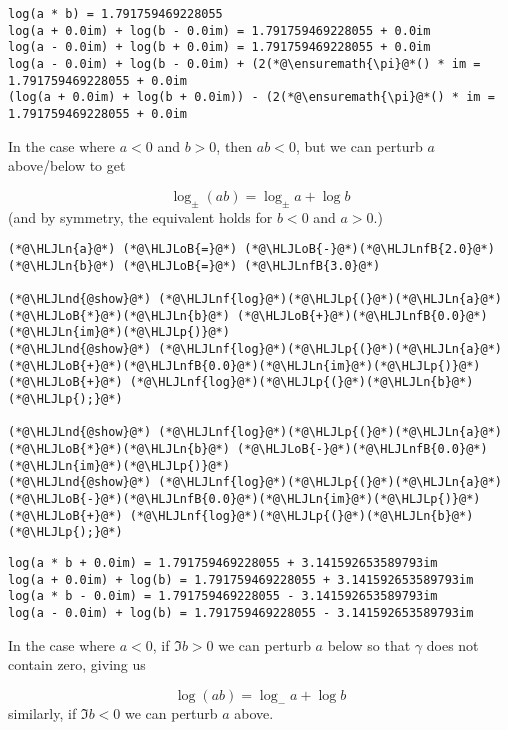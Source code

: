 \documentclass[12pt,landscape]{article}
\newcommand{\HLJLn}[1]{#1}
\newcommand{\HLJLnd}[1]{\textcolor[RGB]{214,102,97}{#1}}
\newcommand{\HLJLnf}[1]{\textcolor[RGB]{66,102,213}{#1}}
\newcommand{\HLJLnfB}[1]{\textcolor[RGB]{59,151,46}{#1}}
\newcommand{\HLJLoB}[1]{\textcolor[RGB]{102,102,102}{\textbf{#1}}}
\newcommand{\HLJLp}[1]{#1}
\begin{document}
{\begin{lstlisting}
log(a * b) = 1.791759469228055
log(a + 0.0im) + log(b - 0.0im) = 1.791759469228055 + 0.0im
log(a - 0.0im) + log(b + 0.0im) = 1.791759469228055 + 0.0im
log(a - 0.0im) + log(b - 0.0im) + (2(*@\ensuremath{\pi}@*() * im = 1.791759469228055 + 0.0im
(log(a + 0.0im) + log(b + 0.0im)) - (2(*@\ensuremath{\pi}@*() * im = 1.791759469228055 + 0.0im
\end{lstlisting}


In the case where $a < 0$ and $b > 0$, then $a b < 0$, but we can perturb $a$ above/below to get

\[
\log_\pm(a b) = \log_\pm a + \log b
\]
(and by symmetry, the equivalent holds for $b < 0$ and $a > 0$.)


\begin{lstlisting}
(*@\HLJLn{a}@*) (*@\HLJLoB{=}@*) (*@\HLJLoB{-}@*)(*@\HLJLnfB{2.0}@*)
(*@\HLJLn{b}@*) (*@\HLJLoB{=}@*) (*@\HLJLnfB{3.0}@*)

(*@\HLJLnd{@show}@*) (*@\HLJLnf{log}@*)(*@\HLJLp{(}@*)(*@\HLJLn{a}@*)(*@\HLJLoB{*}@*)(*@\HLJLn{b}@*) (*@\HLJLoB{+}@*)(*@\HLJLnfB{0.0}@*)(*@\HLJLn{im}@*)(*@\HLJLp{)}@*)
(*@\HLJLnd{@show}@*) (*@\HLJLnf{log}@*)(*@\HLJLp{(}@*)(*@\HLJLn{a}@*)(*@\HLJLoB{+}@*)(*@\HLJLnfB{0.0}@*)(*@\HLJLn{im}@*)(*@\HLJLp{)}@*) (*@\HLJLoB{+}@*) (*@\HLJLnf{log}@*)(*@\HLJLp{(}@*)(*@\HLJLn{b}@*)(*@\HLJLp{);}@*)

(*@\HLJLnd{@show}@*) (*@\HLJLnf{log}@*)(*@\HLJLp{(}@*)(*@\HLJLn{a}@*)(*@\HLJLoB{*}@*)(*@\HLJLn{b}@*) (*@\HLJLoB{-}@*)(*@\HLJLnfB{0.0}@*)(*@\HLJLn{im}@*)(*@\HLJLp{)}@*)
(*@\HLJLnd{@show}@*) (*@\HLJLnf{log}@*)(*@\HLJLp{(}@*)(*@\HLJLn{a}@*)(*@\HLJLoB{-}@*)(*@\HLJLnfB{0.0}@*)(*@\HLJLn{im}@*)(*@\HLJLp{)}@*) (*@\HLJLoB{+}@*) (*@\HLJLnf{log}@*)(*@\HLJLp{(}@*)(*@\HLJLn{b}@*)(*@\HLJLp{);}@*)
\end{lstlisting}

\begin{lstlisting}
log(a * b + 0.0im) = 1.791759469228055 + 3.141592653589793im
log(a + 0.0im) + log(b) = 1.791759469228055 + 3.141592653589793im
log(a * b - 0.0im) = 1.791759469228055 - 3.141592653589793im
log(a - 0.0im) + log(b) = 1.791759469228055 - 3.141592653589793im
\end{lstlisting}


In the case where $a < 0$, if $\Im b > 0$ we can perturb $a$ below so that $\gamma$ does not contain zero, giving us

\[
\log(ab) = \log_- a + \log b
\]
similarly, if $\Im b < 0$ we can perturb $a$ above.


}
\end{document}
